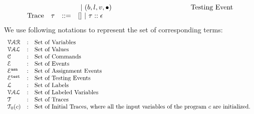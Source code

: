 \[\begin{array}{llll}
&&& ~|~(\bexpr, l, v, \bullet)   ~~~~~~~~~~~~~~~~~~~~~~~~~~~~~~~~~~ \mbox{Testing Event}
\\
%
%
\mbox{Trace} & \trace
& ::= & [] ~|~ \trace :: \event\\
\end{array}
\]
We use following notations to represent the set of corresponding terms:
\[
\begin{array}{lll}
\mathcal{VAR} & : & \mbox{Set of Variables}  
\\ 
%
\mathcal{VAL} & : & \mbox{Set of Values} 
\\ 
%
\cdom & : & \mbox{Set of Commands} 
\\ 
%
\eventset  & : & \mbox{Set of Events}  
\\
%
\eventset^{\asn}  & : & \mbox{Set of Assignment Events}  
\\
%
\eventset^{\test}  & : & \mbox{Set of Testing Events}  
\\
%
\ldom  & : & \mbox{Set of Labels}  
\\
\mathcal{VAL}  & : & \mbox{Set of Labeled Variables}  
\\
%
{\mathcal{T}} & : & \mbox{Set of Traces}
\\
%
\mathcal{T}_0(c) & : & \mbox{Set of Initial Traces, where all the input variables of the program $c$ are initialized.
}
\end{array}
\]
